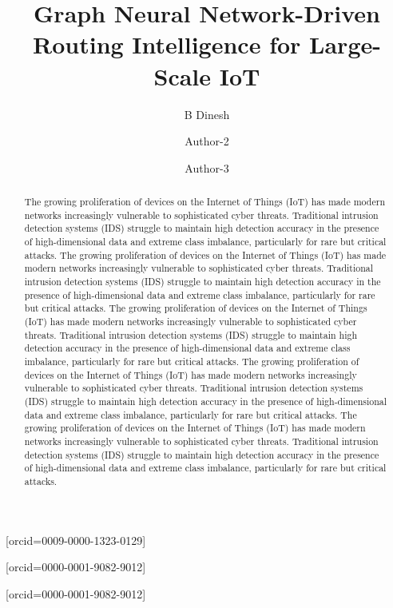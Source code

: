 \documentclass[a4paper,fleqn]{cas-dc}
\numberwithin{equation}{section}
\begin{document}
\let\WriteBookmarks\relax
\def\floatpagepagefraction{1}
\def\textpagefraction{.001}


\title [mode = title]{Graph Neural Network-Driven Routing Intelligence for Large-Scale IoT}                      

\author[1]{B Dinesh}[orcid=0009-0000-1323-0129]
\address[1]{School of Computer Science and Engineering, VIT-AP University, Amaravathi. Andhra Pradesh, India}


\author[1]{Author-2} [orcid=0000-0001-9082-9012]
\cormark[1]


\author[3]{Author-3} [orcid=0000-0001-9082-9012]



\begin{abstract}
The growing proliferation of devices on the Internet of Things (IoT) has made modern networks increasingly vulnerable to sophisticated cyber threats. Traditional intrusion detection systems (IDS) struggle to maintain high detection accuracy in the presence of high-dimensional data and extreme class imbalance, particularly for rare but critical attacks. The growing proliferation of devices on the Internet of Things (IoT) has made modern networks increasingly vulnerable to sophisticated cyber threats. Traditional intrusion detection systems (IDS) struggle to maintain high detection accuracy in the presence of high-dimensional data and extreme class imbalance, particularly for rare but critical attacks. The growing proliferation of devices on the Internet of Things (IoT) has made modern networks increasingly vulnerable to sophisticated cyber threats. Traditional intrusion detection systems (IDS) struggle to maintain high detection accuracy in the presence of high-dimensional data and extreme class imbalance, particularly for rare but critical attacks. The growing proliferation of devices on the Internet of Things (IoT) has made modern networks increasingly vulnerable to sophisticated cyber threats. Traditional intrusion detection systems (IDS) struggle to maintain high detection accuracy in the presence of high-dimensional data and extreme class imbalance, particularly for rare but critical attacks. The growing proliferation of devices on the Internet of Things (IoT) has made modern networks increasingly vulnerable to sophisticated cyber threats. Traditional intrusion detection systems (IDS) struggle to maintain high detection accuracy in the presence of high-dimensional data and extreme class imbalance, particularly for rare but critical attacks.
\end{abstract}
\end{document}
